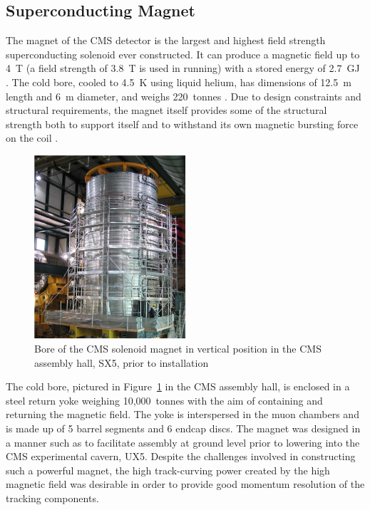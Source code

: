 \subsection{Superconducting Magnet}
\label{ss:Magnet}
The magnet of the CMS detector is the largest and highest field strength superconducting solenoid ever
constructed. It can produce a magnetic field up to 4~T (a field strength of 3.8~T is used in running) with a
stored energy of 2.7~GJ \cite{CMS_TDR1}. The cold bore, cooled to 4.5~K using liquid helium, has dimensions of
12.5~m length and 6~m diameter, and weighs 220~tonnes \cite{Cryogenic_System_for_Superconducting_Solenoid}.
Due to design constraints and structural requirements, the magnet itself provides some of the structural strength both to support itself and to
withstand its own magnetic bursting force on the coil \cite{CMS_experiment}.

\begin{figure}[hbtp]
   \centering
     \includegraphics[width=0.5\textwidth]{Chapters/02_Detector/Images/Cold_mass.png}\hfill
     \caption{Bore of the CMS solenoid magnet in vertical position in the CMS assembly hall, SX5, prior to
     installation \cite{CMS_experiment}}
     \label{fig:CMS_magnet_cold_bore}
\end{figure}
 
The cold bore, pictured in Figure~\ref{fig:CMS_magnet_cold_bore} in the CMS assembly hall, is enclosed in a
steel return yoke weighing 10,000~tonnes with the aim of containing and returning the magnetic field. The yoke is interspersed in the
muon chambers and is made up of 5 barrel segments and 6 endcap discs. The magnet was designed in a manner such
as to facilitate assembly at ground level prior to lowering into the CMS experimental cavern, UX5.
Despite the challenges involved in constructing such a powerful magnet, the high track-curving power created
by the high magnetic field was desirable in order to provide good momentum resolution of the tracking
components.

